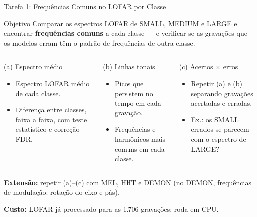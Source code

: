 \documentclass[aspectratio=169]{beamer}
\begin{document}
\begin{frame}{Tarefa 1: Frequências Comuns no LOFAR por Classe}
    \footnotesize
    \begin{block}{\small Objetivo}
        \scriptsize
        Comparar os espectros LOFAR de SMALL, MEDIUM e LARGE e encontrar \textbf{frequências comuns} a cada classe --- e verificar se as gravações que os modelos erram têm o padrão de frequências de outra classe.
    \end{block}

    \vspace{0.05cm}
    \begin{columns}[t]
        \begin{block}{\small (a) Espectro médio}
            \scriptsize
            \begin{itemize}
                \setlength{\itemsep}{1pt}
                \item Espectro LOFAR médio de cada classe.
                \item Diferença entre classes, faixa a faixa, com teste estatístico e correção FDR.
            \end{itemize}
        \end{block}

        \begin{block}{\small (b) Linhas tonais}
            \scriptsize
            \begin{itemize}
                \setlength{\itemsep}{1pt}
                \item Picos que persistem no tempo em cada gravação.
                \item Frequências e harmônicos mais comuns em cada classe.
            \end{itemize}
        \end{block}

        \begin{block}{\small (c) Acertos $\times$ erros}
            \scriptsize
            \begin{itemize}
                \setlength{\itemsep}{1pt}
                \item Repetir (a) e (b) separando gravações acertadas e erradas.
                \item Ex.: os SMALL errados se parecem com o espectro de LARGE?
            \end{itemize}
        \end{block}
    \end{columns}

    \vspace{0.05cm}
    {\scriptsize\textbf{Extensão:} repetir (a)--(c) com MEL, HHT e DEMON (no DEMON, frequências de modulação: rotação do eixo e pás).\par}
    {\scriptsize\textbf{Custo:} LOFAR já processado para as 1.706 gravações; roda em CPU.\par}
\end{frame}
\end{document}
